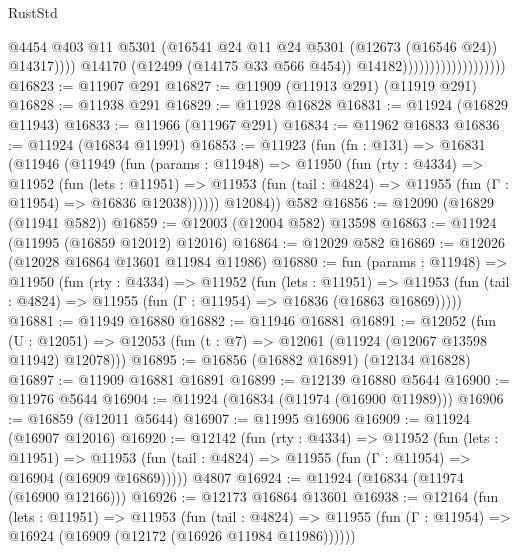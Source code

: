\begin{lexlean}{RustStd}
\begin{coremodule}
                                                @4454
                                                @403
                                                @11
                                                @5301
                                                (@16541
                                                  @24
                                                  @11
                                                  @24
                                                  @5301
                                                  (@12673 (@16546 @24))
                                                  @14317))))
                                          @14170
                                          (@12499 (@14175 @33 @566 @454))
                                          @14182)))))))))))))))))))
@16823 := @11907 @291
@16827 := @11909 (@11913 @291) (@11919 @291)
@16828 := @11938 @291
@16829 := @11928 @16828
@16831 := @11924 (@16829 @11943)
@16833 := @11966 (@11967 @291)
@16834 := @11962 @16833
@16836 := @11924 (@16834 @11991)
@16853 := @11923
    (fun (fn : @131) =>
    @16831
      (@11946
        (@11949
          (fun (params : @11948) =>
          @11950
            (fun (rty : @4334) =>
            @11952
              (fun (lets : @11951) =>
              @11953 (fun (tail : @4824) => @11955 (fun (Γ : @11954) => @16836 @12038))))))
        @12084))
    @582
@16856 := @12090 (@16829 (@11941 @582))
@16859 := @12003 (@12004 @582) @13598
@16863 := @11924 (@11995 (@16859 @12012) @12016)
@16864 := @12029 @582
@16869 := @12026 (@12028 @16864 @13601 @11984 @11986)
@16880 := fun (params : @11948) =>
  @11950
    (fun (rty : @4334) =>
    @11952
      (fun (lets : @11951) =>
      @11953 (fun (tail : @4824) => @11955 (fun (Γ : @11954) => @16836 (@16863 @16869)))))
@16881 := @11949 @16880
@16882 := @11946 @16881
@16891 := @12052
    (fun (U : @12051) => @12053 (fun (t : @7) => @12061 (@11924 (@12067 @13598 @11942) @12078)))
@16895 := @16856 (@16882 @16891) (@12134 @16828)
@16897 := @11909 @16881 @16891
@16899 := @12139 @16880 @5644
@16900 := @11976 @5644
@16904 := @11924 (@16834 (@11974 (@16900 @11989)))
@16906 := @16859 (@12011 @5644)
@16907 := @11995 @16906
@16909 := @11924 (@16907 @12016)
@16920 := @12142
    (fun (rty : @4334) =>
    @11952
      (fun (lets : @11951) =>
      @11953 (fun (tail : @4824) => @11955 (fun (Γ : @11954) => @16904 (@16909 @16869)))))
    @4807
@16924 := @11924 (@16834 (@11974 (@16900 @12166)))
@16926 := @12173 @16864 @13601
@16938 := @12164
    (fun (lets : @11951) =>
    @11953
      (fun (tail : @4824) =>
      @11955 (fun (Γ : @11954) => @16924 (@16909 (@12172 (@16926 @11984 @11986))))))

\end{coremodule}
\end{lexlean}
